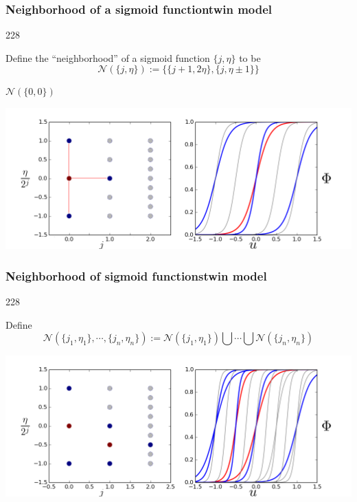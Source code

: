 \documentclass{beamer}
\newcommand{\barrow}{\item[\color{darkred}\ding{228}]}
\begin{document}
\begin{frame}
    \frametitle{Neighborhood of a sigmoid function\hfill \scriptsize{twin model}}\small
    \begin{dinglist}{228}
        \barrow
        Define the ``neighborhood'' of a sigmoid function $\{j, \eta\}$ 
        to be
        $$
            \mathcal{N}(\{j, \eta\}) := \big\{ \{j+1, 2\eta\}, \{j, \eta\pm 1\}\big\}
        $$
        \barrow $\mathcal{N}(\{0,0\})$ 
        \begin{center}
            \includegraphics[width=10.cm]{basis_neighbor.png}
        \end{center}
    \end{dinglist}
\end{frame}

\begin{frame}
    \frametitle{Neighborhood of sigmoid functions\hfill \scriptsize{twin model}}\small
    \begin{dinglist}{228}
        \barrow Define
        $$
            \mathcal{N}(\{j_1, \eta_1\}, \cdots, \{j_n, \eta_n\})
            := \mathcal{N}(\{j_1, \eta_1\})\bigcup \cdots \bigcup \mathcal{N}(\{j_n, \eta_n\})
        $$
        \begin{center}
            \includegraphics[width=10.cm]{basis_neighbor_2.png}
        \end{center}
    \end{dinglist}
\end{frame}
\end{document}
